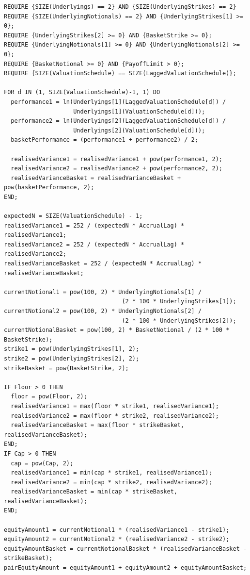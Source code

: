 \begin{listing}[hbt]
\begin{verbatim}
REQUIRE {SIZE(Underlyings) == 2} AND {SIZE(UnderlyingStrikes) == 2}
REQUIRE {SIZE(UnderlyingNotionals) == 2} AND {UnderlyingStrikes[1] >= 0};
REQUIRE {UnderlyingStrikes[2] >= 0} AND {BasketStrike >= 0};
REQUIRE {UnderlyingNotionals[1] >= 0} AND {UnderlyingNotionals[2] >= 0};
REQUIRE {BasketNotional >= 0} AND {PayoffLimit > 0};
REQUIRE {SIZE(ValuationSchedule) == SIZE(LaggedValuationSchedule)};

FOR d IN (1, SIZE(ValuationSchedule)-1, 1) DO
  performance1 = ln(Underlyings[1](LaggedValuationSchedule[d]) /
                    Underlyings[1](ValuationSchedule[d]));
  performance2 = ln(Underlyings[2](LaggedValuationSchedule[d]) /
                    Underlyings[2](ValuationSchedule[d]));
  basketPerformance = (performance1 + performance2) / 2;

  realisedVariance1 = realisedVariance1 + pow(performance1, 2);
  realisedVariance2 = realisedVariance2 + pow(performance2, 2);
  realisedVarianceBasket = realisedVarianceBasket + pow(basketPerformance, 2);
END;

expectedN = SIZE(ValuationSchedule) - 1;
realisedVariance1 = 252 / (expectedN * AccrualLag) * realisedVariance1;
realisedVariance2 = 252 / (expectedN * AccrualLag) * realisedVariance2;
realisedVarianceBasket = 252 / (expectedN * AccrualLag) * realisedVarianceBasket;

currentNotional1 = pow(100, 2) * UnderlyingNotionals[1] /
                                  (2 * 100 * UnderlyingStrikes[1]);
currentNotional2 = pow(100, 2) * UnderlyingNotionals[2] /
                                  (2 * 100 * UnderlyingStrikes[2]);
currentNotionalBasket = pow(100, 2) * BasketNotional / (2 * 100 * BasketStrike);
strike1 = pow(UnderlyingStrikes[1], 2);
strike2 = pow(UnderlyingStrikes[2], 2);
strikeBasket = pow(BasketStrike, 2);

IF Floor > 0 THEN
  floor = pow(Floor, 2);
  realisedVariance1 = max(floor * strike1, realisedVariance1);
  realisedVariance2 = max(floor * strike2, realisedVariance2);
  realisedVarianceBasket = max(floor * strikeBasket, realisedVarianceBasket);
END;
IF Cap > 0 THEN
  cap = pow(Cap, 2);
  realisedVariance1 = min(cap * strike1, realisedVariance1);
  realisedVariance2 = min(cap * strike2, realisedVariance2);
  realisedVarianceBasket = min(cap * strikeBasket, realisedVarianceBasket);
END;

equityAmount1 = currentNotional1 * (realisedVariance1 - strike1);
equityAmount2 = currentNotional2 * (realisedVariance2 - strike2);
equityAmountBasket = currentNotionalBasket * (realisedVarianceBasket - strikeBasket);
pairEquityAmount = equityAmount1 + equityAmount2 + equityAmountBasket;


\end{verbatim}
\end{listing}
